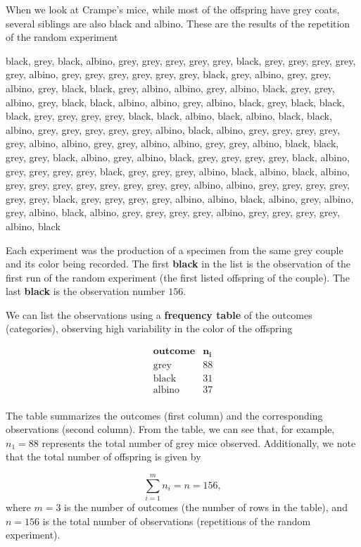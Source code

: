 \documentclass[
]{book}
\begin{document}
When we look at Crampe's mice, while most of the offspring have grey coats, several siblings are also black and albino. These are the results of the repetition of the random experiment

black, grey, black, albino, grey, grey, grey, grey, grey, black, grey, grey, grey, grey, grey, albino, grey, grey, grey, grey, grey, grey, black, grey, albino, grey, grey, albino, grey, black, black, grey, albino, albino, grey, albino, black, grey, grey, albino, grey, black, black, albino, albino, grey, albino, black, grey, black, black, black, grey, grey, grey, grey, black, black, albino, black, albino, black, black, albino, grey, grey, grey, grey, grey, albino, black, albino, grey, grey, grey, grey, grey, albino, albino, grey, grey, albino, albino, grey, grey, albino, black, black, grey, grey, black, albino, grey, albino, black, grey, grey, grey, grey, black, albino, grey, grey, grey, grey, black, grey, grey, grey, albino, black, albino, black, albino, grey, grey, grey, grey, grey, grey, grey, grey, albino, albino, grey, grey, grey, grey, grey, grey, black, grey, grey, grey, grey, albino, albino, black, albino, grey, albino, grey, albino, black, albino, grey, grey, grey, grey, albino, grey, grey, grey, grey, albino, black

Each experiment was the production of a specimen from the same grey couple and its color being recorded. The first \textbf{black} in the list is the observation of the first run of the random experiment (the first listed offspring of the couple). The last \textbf{black} is the observation number \(156\).

We can list the observations using a \textbf{frequency table} of the outcomes (categories), observing high variability in the color of the offspring

\[
\begin{array}{cc}
\mathbf{outcome} & \mathbf{n_i}  \\
\text{grey}  & 88     \\
\text{black}   & 31    \\ 
\text{albino}  & 37   \\ 
\end{array}
\]

The table summarizes the outcomes (first column) and the corresponding observations (second column). From the table, we can see that, for example, \(n_1=88\) represents the total number of grey mice observed. Additionally, we note that the total number of offspring is given by

\[\sum_{i=1}^m n_i= n = 156,\]
where \(m=3\) is the number of outcomes (the number of rows in the table), and \(n=156\) is the total number of observations (repetitions of the random experiment).
\end{document}
